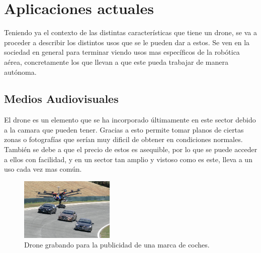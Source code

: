 \section{Aplicaciones actuales }
\hspace{1 cm} Teniendo ya el contexto de las distintas caracter\'isticas que tiene un drone, se va a proceder a describir los distintos usos que se le pueden dar a estos. Se ven en la sociedad en general para terminar viendo usos mas espec\'ificos de la rob\'otica a\'erea, concretamente los que llevan a que este pueda trabajar de manera aut\'onoma. 

\subsection{Medios Audiovisuales}
\hspace{1 cm} El drone es un elemento que se ha incorporado \'ultimamente en este sector debido a la camara que pueden tener. Gracias a esto permite tomar planos de ciertas zonas o fotograf\'ias que ser\'ian muy dificil de obtener en condiciones normales. Tambi\'en se debe a que el precio de estos es asequible, por lo que se puede acceder a ellos con facilidad, y en un sector tan amplio y vistoso como es este, lleva a un uso cada vez mas com\'un.
\begin{figure}[H]
	\centering
		\includegraphics[width=0.4\textwidth]{imgs/anuncio_television.jpg}
				\caption{Drone grabando para la publicidad de una marca de coches.}
	\label{fig:Drone grabando publicidad.}
\end{figure}


